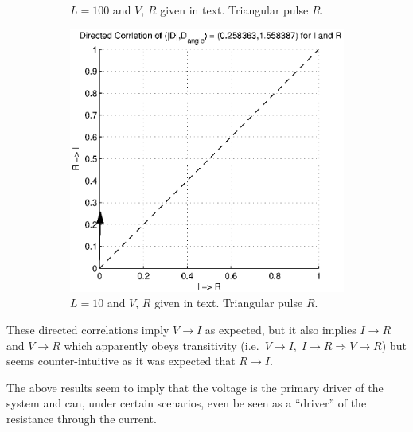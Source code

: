 \documentclass[a4paper,11pt]{article}
\begin{document}
\begin{figure}[h!t]
\begin{subfigure}[b]{0.25\textwidth}
\caption{$L = 100$ and $V$, $R$ given in text.  Triangular pulse $R$.}
\end{subfigure}
\begin{subfigure}[b]{0.25\textwidth}
\label{fig:RL_RTriVsinCCMIR}
\includegraphics[scale=0.4]{graphics/RL_RTriVsinCCMIR.eps}
\caption{$L = 10$ and $V$, $R$ given in text.  Triangular pulse $R$.}
\end{subfigure}
\caption{}
\end{figure}
These directed correlations imply $V\rightarrow I$ as expected, but it also implies $I\rightarrow R$ and $V\rightarrow R$ which apparently obeys transitivity (i.e.\ $V\rightarrow I,\;I\rightarrow R\Rightarrow V\rightarrow R$) but seems counter-intuitive as it was expected that $R\rightarrow I$.

The above results seem to imply that the voltage is the primary driver of the system and can, under certain scenarios, even be seen as a ``driver'' of the resistance through the current.  
\end{document}
